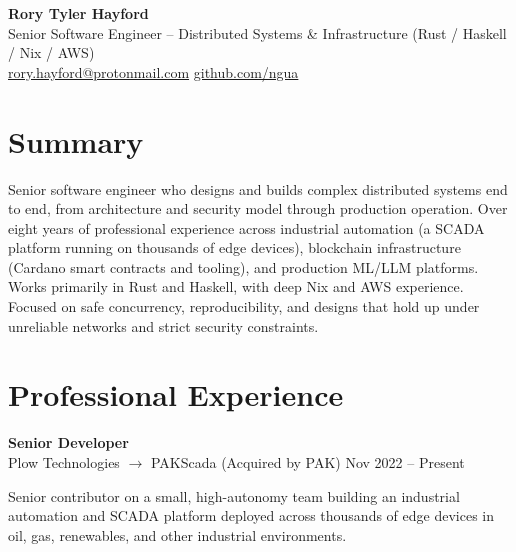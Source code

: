 \documentclass[10.5pt]{article}
\begin{document}
\begin{center}
    {\LARGE \textbf{Rory Tyler Hayford}}\\
    \vspace{4pt}
    Senior Software Engineer -- Distributed Systems \& Infrastructure (Rust / Haskell / Nix / AWS)\\
    \vspace{4pt}
    \href{mailto:rory.hayford@protonmail.com}{rory.hayford@protonmail.com} \quad
    \href{https://github.com/ngua}{github.com/ngua}
\end{center}

\vspace{4pt}

\section*{Summary}

Senior software engineer who designs and builds complex distributed systems end to end, from architecture and security model through production operation. Over eight years of professional experience across industrial automation (a SCADA platform running on thousands of edge devices), blockchain infrastructure (Cardano smart contracts and tooling), and production ML/LLM platforms. Works primarily in Rust and Haskell, with deep Nix and AWS experience. Focused on safe concurrency, reproducibility, and designs that hold up under unreliable networks and strict security constraints.

\section*{Professional Experience}

\textbf{Senior Developer} \\
Plow Technologies $\rightarrow$ PAKScada (Acquired by PAK) \hfill Nov 2022 -- Present

Senior contributor on a small, high-autonomy team building an industrial automation and SCADA platform deployed across thousands of edge devices in oil, gas, renewables, and other industrial environments.
\end{document}
